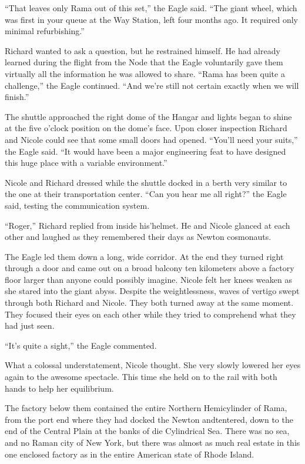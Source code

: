 \documentclass[]{article}
\begin{document}
{“That leaves only Rama out of this set,” the Eagle said. “The giant wheel, which was first in your queue at the Way Station, left four months ago. It required only minimal refurbishing.”

Richard wanted to ask a question, but he restrained himself. He had already learned during the flight from the Node that the Eagle voluntarily gave them virtually all the information he was allowed to share. “Rama has been quite a challenge,” the Eagle continued. “And we’re still not certain exactly when we will finish.”

The shuttle approached the right dome of the Hangar and lights began to shine at the five o’clock position on the dome’s face. Upon closer inspection Richard and Nicole could see that some small doors had opened. “You’ll need your suits,” the Eagle said. “It would have been a major engineering feat to have designed this huge place with a variable environment.”

Nicole and Richard dressed while the shuttle docked in a berth very similar to the one at their transportation center. “Can you hear me all right?” the Eagle said, testing the communication system.

“Roger,” Richard replied from inside his’helmet. He and Nicole glanced at each other and laughed as they remembered their days as Newton cosmonauts.

The Eagle led them down a long, wide corridor. At the end they turned right through a door and came out on a broad balcony ten kilometers above a factory floor larger than anyone could possibly imagine. Nicole felt her knees weaken as she stared into the giant abyss. Despite the weightlessness, waves of vertigo swept through both Richard and Nicole. They both turned away at the same moment. They focused their eyes on each other while they tried to comprehend what they had just seen.

“It’s quite a sight,” the Eagle commented.

What a colossal understatement, Nicole thought. She very slowly lowered her eyes again to the awesome spectacle. This time she held on to the rail with both hands to help her equilibrium.

The factory below them contained the entire Northern Hemicylinder of Rama, from the port end where they had docked the Newton andtentered, down to the end of the Central Plain at the banks of die Cylindrical Sea. There was no sea, and no Raman city of New York, but there was almost as much real estate in this one enclosed factory as in the entire American state of Rhode Island.

}
\end{document}
